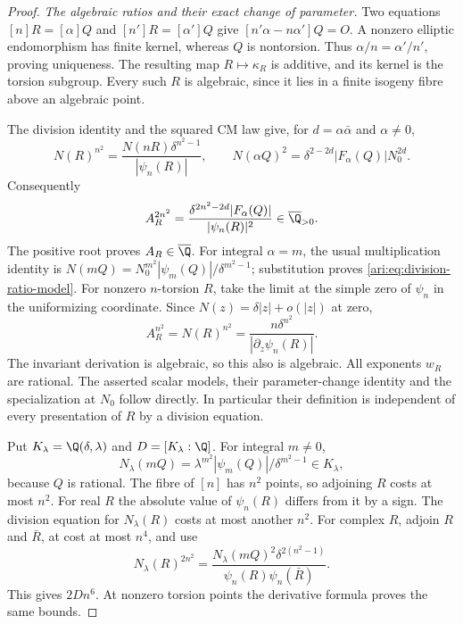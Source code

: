 \begin{proof}
\emph{The algebraic ratios and their exact change of parameter.}
Two equations $[n]R=[\alpha]Q$ and $[n']R=[\alpha']Q$
give $[n'\alpha-n\alpha']Q=O$. A nonzero elliptic endomorphism
has finite kernel, whereas $Q$ is nontorsion. Thus
$\alpha/n=\alpha'/n'$, proving uniqueness. The resulting
map $R\mapsto\kappa_R$ is additive, and its kernel is the
torsion subgroup. Every such $R$ is algebraic, since it lies
in a finite isogeny fibre above an algebraic point.

The division identity and the squared CM law give, for
$d=\alpha\bar\alpha$ and $\alpha\ne0$,
\[
 N(R)^{n^2}=\frac{N(nR)\delta^{n^2-1}}{|\psi_n(R)|},
 \qquad
 N(\alpha Q)^2=\delta^{2-2d}|F_\alpha(Q)|N_0^{2d}.
\]
Consequently
\[
 A_R^{2n^2}=\frac{\delta^{2n^2-2d}|F_\alpha(Q)|}
                         {|\psi_n(R)|^2}\in\overline\Q_{>0}.
\]
The positive root proves $A_R\in\overline\Q$. For integral
$\alpha=m$, the usual multiplication identity is
$N(mQ)=N_0^{m^2}|\psi_m(Q)|/\delta^{m^2-1}$;
substitution proves \eqref{ari:eq:division-ratio-model}.
For nonzero $n$-torsion $R$, take the limit at the simple zero
of $\psi_n$ in the uniformizing coordinate. Since
$N(z)=\delta|z|+o(|z|)$ at zero,
\[
 A_R^{n^2}=N(R)^{n^2}
       =\frac{n\delta^{n^2}}{|\partial_z\psi_n(R)|}.
\]
The invariant derivation is algebraic, so this also is algebraic.
All exponents $w_R$ are rational. The asserted scalar models,
their parameter-change identity and the specialization at $N_0$
follow directly. In particular their definition is independent
of every presentation of $R$ by a division equation.

Put $K_\lambda=\Q(\delta,\lambda)$ and
$D=[K_\lambda:\Q]$. For integral $m\ne0$,
\[
 N_\lambda(mQ)=\lambda^{m^2}
                     |\psi_m(Q)|/\delta^{m^2-1}\in K_\lambda,
\]
because $Q$ is rational. The fibre of $[n]$ has $n^2$ points,
so adjoining $R$ costs at most $n^2$. For real $R$ the absolute
value of $\psi_n(R)$ differs from it by a sign. The division
equation for $N_\lambda(R)$ costs at most another $n^2$.
For complex $R$, adjoin $R$ and $\bar R$, at cost at most
$n^4$, and use
\[
 N_\lambda(R)^{2n^2}
 =\frac{N_\lambda(mQ)^2\delta^{2(n^2-1)}}
              {\psi_n(R)\psi_n(\bar R)}.
\]
This gives $2Dn^6$. At nonzero torsion points the derivative
formula proves the same bounds.


\end{proof}
